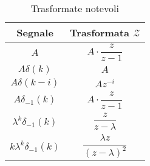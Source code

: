 \documentclass[a4paper]{article}
\newcommand{\Z}{\mathcal{Z}}
\begin{document}
	\begin{table}[!htbp]
		\centering
	
		\begin{tabular}{@{} c c @{}}
			\toprule
			Segnale & Trasformata $\Z$ \\
			\midrule
			$\mathit{A}$ 					& $A \cdot \dfrac{z}{z-1}$ 				\\
			$A\delta(k)$ 					& $A$									\\
			$A\delta(k-i)$					& $A z^{-i}$							\\
			$A\delta_{-1}(k)$				& $A \cdot \dfrac{z}{z-1}$				\\
			$\lambda^k \delta_{-1} (k)$		& $\dfrac{z}{z-\lambda}$				\\
			$k\lambda^k \delta_{-1} (k)$	& $\dfrac{\lambda z}{(z-\lambda)^2}$	\\
			\bottomrule
		\end{tabular}
	
		\caption{Trasformate notevoli}
		\label{tab-trasf_not}
	\end{table}
	
\end{document}
